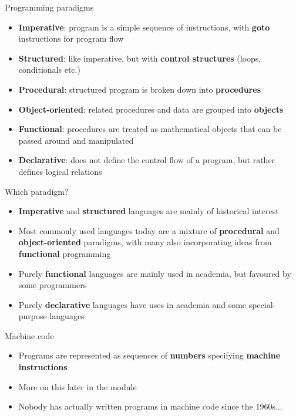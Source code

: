 \begin{frame}{Programming paradigms}
	\begin{itemize}
		\pause\item \textbf{Imperative}: program is a simple sequence of instructions,
			with \textbf{goto} instructions for program flow
		\pause\item \textbf{Structured}: like imperative, but with \textbf{control structures}
			(loops, conditionals etc.)
		\pause\item \textbf{Procedural}: structured program is broken down into
			\textbf{procedures}
		\pause\item \textbf{Object-oriented}: related procedures and data are grouped into
			\textbf{objects}
		\pause\item \textbf{Functional}: procedures are treated as mathematical objects that
			can be passed around and manipulated
		\pause\item \textbf{Declarative}: does not define the control flow of a program,
			but rather defines logical relations
	\end{itemize}
\end{frame}

\begin{frame}{Which paradigm?}
	\begin{itemize}
		\pause\item \textbf{Imperative} and \textbf{structured} languages are mainly of
			historical interest
		\pause\item Most commonly used languages today are a mixture of \textbf{procedural}
			and \textbf{object-oriented} paradigms, with many also incorporating
			ideas from \textbf{functional} programming
		\pause\item Purely \textbf{functional} languages are mainly used in academia,
			but favoured by some programmers
		\pause\item Purely \textbf{declarative} languages have uses in academia and some special-purpose languages
	\end{itemize}
\end{frame}

\begin{frame}{Machine code}
	\begin{itemize}
		\pause\item Programs are represented as sequences of \textbf{numbers}
			specifying \textbf{machine instructions}
		\pause\item More on this later in the module
		\pause\item Nobody has actually written programs in machine code since the 1960s...
	\end{itemize}
\end{frame}

